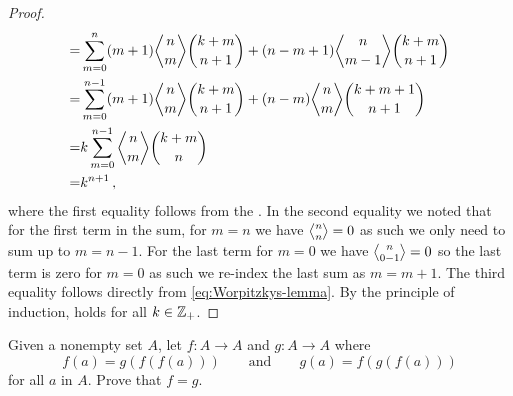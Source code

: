 \documentclass[a4paper, english, 12pt]{article} %
\begin{document}
\begin{answer}
\begin{proof}
\begin{align*}
    = & \sum_{m=0}^{n}  (m+1)   \eulerian{n}{m}   \binom{k+m}{n+1} 
    +                  (n-m+1) \eulerian{n}{m-1} \binom{k+m}{n+1} \\
    = & \sum_{m=0}^{n-1} (m+1)   \eulerian{n}{m}  \binom{k+m}{n+1} 
    +                  (n-m)   \eulerian{n}{m}  \binom{k+m+1}{n+1} \\
    = & k \sum_{m = 0}^{n-1} \eulerian{n}{m} \binom{k+m}{n} \\
    = & k^{n+1}\,,
  \end{align*}
  where the first equality follows from the . In the second equality we noted that for the
  first term in the sum, for $m=n$ we have $\eulerian{n}{n} = 0$ as such we only
  need to sum up to $m=n-1$. For the last term for $m=0$ we have
  $\eulerian{n}{0-1} = 0$ so the last term is zero for $m = 0$ as such we
  re-index the last sum as $m = m + 1$. The third equality follows directly from
  \cref{eq:Worpitzkys-lemma}. By the principle of induction,
   holds for all $k \in \mathbb{Z}_+$.
  \end{proof}
\end{answer}



\begin{problem}[23]
  Given a nonempty set $A$, let $f \colon A \to A$ and $g \colon A \to A$ where
  \begin{equation*}
    f(a) = g(f(f(a)))
    \qquad \text{and} \qquad
    g(a) = f(g(f(a)))
  \end{equation*}
  for all $a$ in $A$. Prove that $f = g$.
\end{problem}
\end{document}
